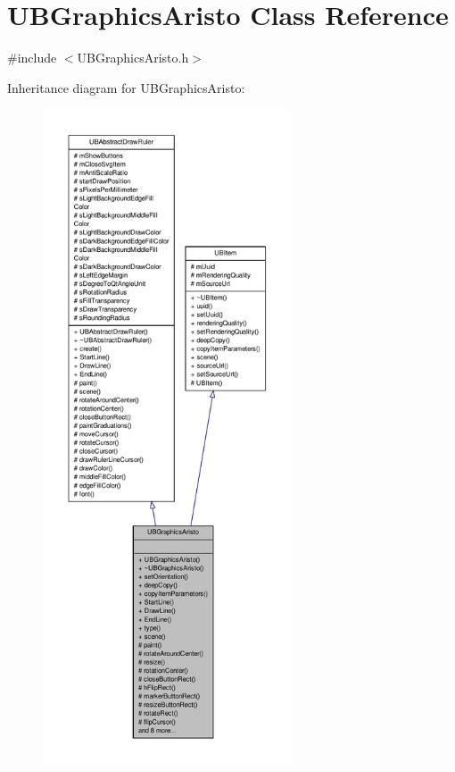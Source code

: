 \hypertarget{class_u_b_graphics_aristo}{\section{U\-B\-Graphics\-Aristo Class Reference}
\label{dc/dfd/class_u_b_graphics_aristo}
}


{\ttfamily \#include $<$U\-B\-Graphics\-Aristo.\-h$>$}



Inheritance diagram for U\-B\-Graphics\-Aristo\-:
\nopagebreak
\begin{figure}[H]
\begin{center}
\leavevmode
\includegraphics[height=550pt]{d5/d20/class_u_b_graphics_aristo__inherit__graph}
\end{center}
\end{figure}


